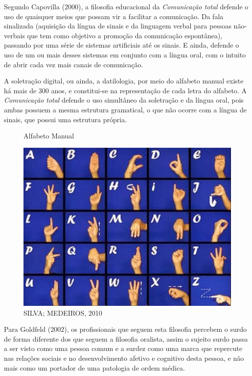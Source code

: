 \documentclass[brasil]{abnt}
\begin{document}
		 Segundo Capovilla (2000), a filosofia educacional da \textit{Comunicação total} defende o uso de quaisquer meios que possam vir a facilitar a comunicação. Da fala sinalizada (aquisição da língua
		 de sinais e da linguagem verbal para pessoas não-verbais que tem como objetivo a promoção da comunicação espontânea), passando por uma série de sistemas artificiais até os sinais. E ainda, defende o uso de um 
		 ou mais desses sistemas em conjunto com a língua oral, com o intuito de abrir cada vez mais canais de comunicação.
		 
		 A soletração digital, ou ainda, a datilologia, por meio do alfabeto manual existe há mais de 300 anos, e constitui-se na representação de cada letra do alfabeto. 
		 A \textit{Comunicação total} defende o uso simultâneo da soletração e da língua oral, pois ambas possuem a mesma estrutura gramatical, o que não ocorre com a língua de sinais, que possui uma estrutura
		 própria.
		 
				\begin{figure}[!htb]
						\center
						\caption{Alfabeto Manual}
						\includegraphics[width=125mm]{dat.png}
						\caption{SILVA; MEDEIROS, 2010}
				\end{figure}
		 
		 Para Goldfeld (2002), os profissionais que seguem esta filosofia percebem o surdo de forma diferente dos que seguem a filosofia oralista, assim o sujeito surdo passa a ser visto como uma pessoa comum 
		 e a surdez como uma marca que repercute nas relações sociais e no desenvolvimento afetivo e cognitivo desta pessoa, e não mais como um portador de uma patologia de ordem médica.
		
\end{document}
